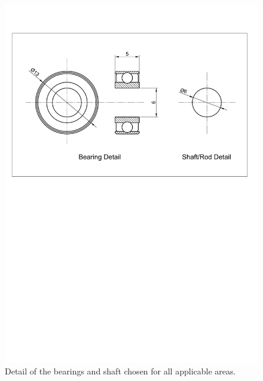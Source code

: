         \begin{figure}[h!]
          \centering
          \includegraphics[clip, trim=2cm 16cm 2cm 3cm, width=0.7\linewidth]{figures/bearing-shaft-detail}
          \caption[Detail of the bearings and shaft chosen for all applicable areas.]{Detail of the bearings and shaft chosen for all applicable areas.}
          \label{fig:mechDesign-bearingShaftDetail}
        \end{figure}        
        
